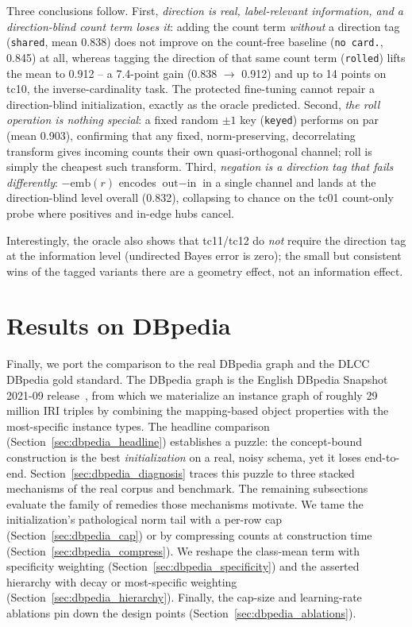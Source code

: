 \documentclass[a4paper,oneside,bibliography=totoc]{scrbook}
\begin{document}
Three conclusions follow. First, \emph{direction is real, label-relevant
information, and a direction-blind count term loses it}: adding the count term
\emph{without} a direction tag (\texttt{shared}, mean 0.838) does not improve on
the count-free baseline (\texttt{no card.}, 0.845) at all, whereas tagging the
direction of that same count term (\texttt{rolled}) lifts the mean to 0.912 -- 
a 7.4-point gain (0.838 $\rightarrow$ 0.912) and up to 14 points on tc10, the
inverse-cardinality task. The protected fine-tuning cannot repair a
direction-blind initialization, exactly as the oracle predicted. Second,
\emph{the roll operation is nothing special}: a fixed random $\pm 1$ key
(\texttt{keyed}) performs on par (mean 0.903), confirming that any fixed,
norm-preserving, decorrelating transform gives incoming counts their own
quasi-orthogonal channel; $\mathrm{roll}$ is simply the cheapest such
transform. Third, \emph{negation is a direction tag that fails differently}:
$-\mathrm{emb}(r)$ encodes $\text{out} - \text{in}$ in a single channel and
lands at the direction-blind level overall (0.832), collapsing to chance on
the tc01 count-only probe where positives and in-edge hubs cancel.

Interestingly, the oracle also shows that tc11/tc12 do \emph{not} require the
direction tag at the information level (undirected Bayes error is zero); the
small but consistent wins of the tagged variants there are a geometry effect,
not an information effect.

\section{Results on DBpedia}
\label{sec:results_dbpedia}

Finally, we port the comparison to the real DBpedia graph and the DLCC DBpedia
gold standard. The DBpedia graph is the English DBpedia Snapshot 2021-09
release~\cite{dbpedia_snapshot_2021}, from which we materialize an instance graph
of roughly 29 million IRI triples by combining the mapping-based object
properties with the most-specific instance types. The headline comparison
(Section~\ref{sec:dbpedia_headline})
establishes a puzzle: the concept-bound construction is the best
\emph{initialization} on a real, noisy schema, yet it loses end-to-end.
Section~\ref{sec:dbpedia_diagnosis} traces this puzzle to three stacked
mechanisms of the real corpus and benchmark. The remaining subsections evaluate
the family of remedies those mechanisms motivate. We tame the initialization's
pathological norm tail with a per-row cap (Section~\ref{sec:dbpedia_cap}) or by
compressing counts at construction time (Section~\ref{sec:dbpedia_compress}). We
reshape the class-mean term with specificity weighting
(Section~\ref{sec:dbpedia_specificity}) and the asserted hierarchy with decay or
most-specific weighting (Section~\ref{sec:dbpedia_hierarchy}). Finally, the
cap-size and learning-rate ablations pin down the design points
(Section~\ref{sec:dbpedia_ablations}).
\end{document}
